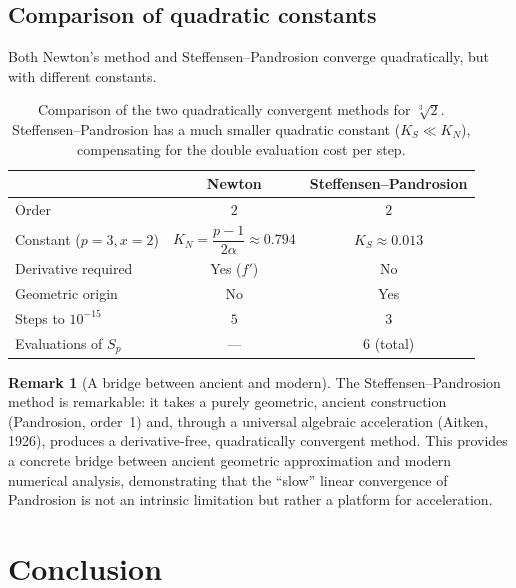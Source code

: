\documentclass[11pt,a4paper]{article}
\theoremstyle{definition}
\newtheorem{remark}{Remark}[section]
\newcommand{\cbrt}[1]{\sqrt[3]{#1}}
\begin{document}
\subsection{Comparison of quadratic constants}

Both Newton's method and Steffensen--Pandrosion converge quadratically, but with different constants.

\begin{table}[h]
\centering
\renewcommand{\arraystretch}{1.3}
\begin{tabular}{lcc}
\toprule
& \textbf{Newton} & \textbf{Steffensen--Pandrosion} \\
\midrule
Order & $2$ & $2$ \\
Constant ($p\!=\!3, x\!=\!2$) & $K_N = \dfrac{p-1}{2\alpha} \approx 0.794$ & $K_S \approx 0.013$ \\
Derivative required & Yes ($f'$) & No \\
Geometric origin & No & Yes \\
Steps to $10^{-15}$ & $5$ & $3$ \\
Evaluations of $S_p$ & --- & $6$ (total) \\
\bottomrule
\end{tabular}
\caption{Comparison of the two quadratically convergent methods for $\cbrt{2}$. Steffensen--Pandrosion has a much smaller quadratic constant ($K_S \ll K_N$), compensating for the double evaluation cost per step.}
\end{table}

\begin{remark}[A bridge between ancient and modern]
The Steffensen--Pandrosion method is remarkable: it takes a purely geometric, ancient construction (Pandrosion, order~1) and, through a universal algebraic acceleration (Aitken, 1926), produces a derivative-free, quadratically convergent method. This provides a concrete bridge between ancient geometric approximation and modern numerical analysis, demonstrating that the ``slow'' linear convergence of Pandrosion is not an intrinsic limitation but rather a platform for acceleration.
\end{remark}

\section{Conclusion}
\label{sec:conclusion}
\end{document}
